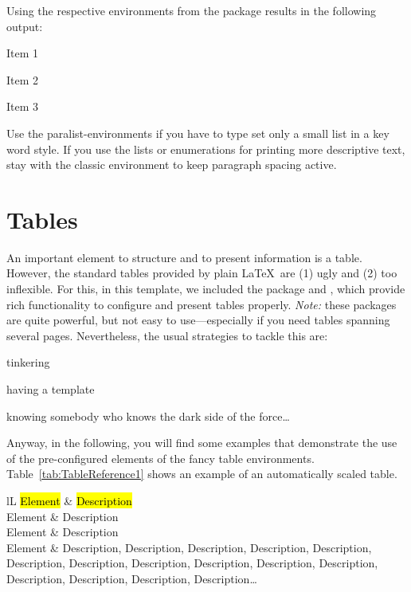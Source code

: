 Using the respective environments from the  package results in the following output:

\begin{compactitem}
	\item Item 1
	\item Item 2
	\item Item 3
\end{compactitem}

\begin{MySugg}
	Use the paralist-environments if you have to type set only a small list in a key word style. If you use the lists or enumerations for printing more descriptive text, stay with the classic environment to keep paragraph spacing active.
\end{MySugg}


\section{Tables}
\label{sec:Tables}
An important element to structure and to present information is a table. However, the standard tables provided by plain \LaTeX\ are (1) ugly and (2) too inflexible. For this, in this template, we included the package  and , which provide rich functionality to configure and present tables properly. \emph{Note:} these packages are quite powerful, but not easy to use---especially if you need tables spanning several pages. Nevertheless, the usual strategies to tackle this are:
\begin{compactenum}
	\item tinkering
	\item having a template
	\item knowing somebody who knows the dark side of the force\ldots
\end{compactenum}
Anyway, in the following, you will find some examples that demonstrate the use of the pre-configured elements of the fancy table environments. Table~\ref{tab:TableReference1} shows an example of an automatically scaled table.
\begin{table}[htbp]
  \caption[Alternative text for table of contents]{Example for a fancy, typographic ``better'' table.}%
  \label{tab:TableReference1}
\begin{tabularx}{\linewidth}{lL}
	\opentableheader  %
		\hl{Element} & \hl{Description} \\
	\closetableheader %
		Element & Description \\
		Element & Description \\
		\midrule
		Element & Description, Description, Description, Description, Description, Description, Description, Description, Description, Description, Description, Description, Description, Description, Description\ldots \\
	\bottomrule
\end{tabularx}
\end{table}

